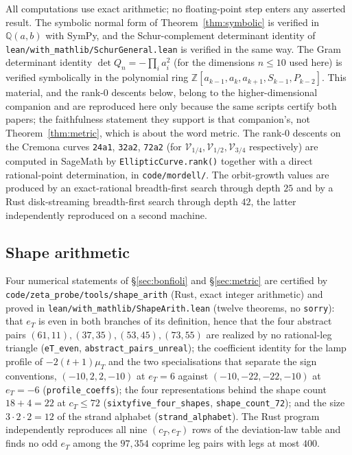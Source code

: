 \documentclass[11pt]{article}
\theoremstyle{plain}
\theoremstyle{definition}
\theoremstyle{remark}
\begin{document}
All computations use exact arithmetic; no floating-point step enters any
asserted result. The symbolic normal form of
Theorem~\ref{thm:symbolic} is verified in $\mathbb{Q}(a,b)$ with SymPy,
and the Schur-complement determinant identity of
\texttt{lean/with\_mathlib/SchurGeneral.lean} is verified in the same way.
The Gram determinant identity $\det Q_n=-\prod_{i} a_i^2$ (for the dimensions $n\le 10$ used here) is verified symbolically in the polynomial
ring $\mathbb{Z}[a_{k-1},a_k,a_{k+1},S_{k-1},P_{k-2}]$. This material, and the
rank-$0$ descents below, belong to the higher-dimensional companion
\cite{Bonfioli2026c} and are reproduced here only because the same scripts
certify both papers; the faithfulness statement they support is that
companion's, not Theorem~\ref{thm:metric}, which is about the word metric. The
rank-$0$ descents on the Cremona curves
\texttt{24a1}, \texttt{32a2}, \texttt{72a2} (for
$\mathcal{V}_{1/4},\mathcal{V}_{1/2},\mathcal{V}_{3/4}$ respectively)
are computed in SageMath by \texttt{EllipticCurve.rank()} together with a
direct rational-point determination, in \texttt{code/mordell/}. The
orbit-growth values are produced by an exact-rational breadth-first
search through depth $25$ and by a Rust disk-streaming breadth-first
search through depth $42$, the latter independently reproduced on a
second machine.

\subsection{Shape arithmetic}
\label{ssec:reproduce-shape}

Four numerical statements of \S\ref{sec:bonfioli} and \S\ref{sec:metric} are certified by
\texttt{code/zeta\_probe/tools/shape\_arith} (Rust, exact integer arithmetic) and proved in
\texttt{lean/with\_mathlib/ShapeArith.lean} (twelve theorems, no \texttt{sorry}): that
$e_T$ is even in both branches of its definition, hence that the four abstract pairs
$(61,11),(37,35),(53,45),(73,55)$ are realized by no rational-leg triangle
(\texttt{eT\_even}, \texttt{abstract\_pairs\_unreal}); the coefficient identity for the lamp
profile of $-2(t+1)\mu_T$ and the two specialisations that separate the sign conventions,
$(-10,2,2,-10)$ at $e_T=6$ against $(-10,-22,-22,-10)$ at $e_T=-6$
(\texttt{profile\_coeffs}); the four representations behind the shape count
$18+4=22$ at $c_T\le72$ (\texttt{sixtyfive\_four\_shapes}, \texttt{shape\_count\_72}); and the
size $3\cdot2\cdot2=12$ of the strand alphabet (\texttt{strand\_alphabet}). The Rust program
independently reproduces all nine $(c_T,e_T)$ rows of the deviation-law table and finds no
odd $e_T$ among the $97{,}354$ coprime leg pairs with legs at most $400$.
\end{document}
